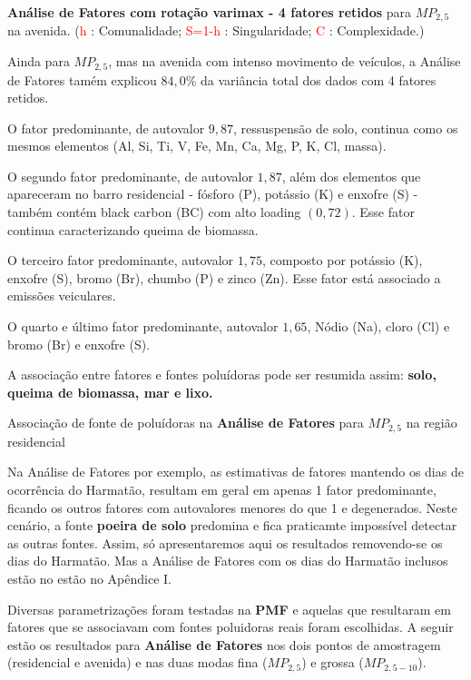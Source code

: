 \begin{table}[H]
  \caption{\textbf{Análise de Fatores com rotação varimax - 4 fatores retidos} 
             para $MP_{2,5}$ na avenida.
           (\textcolor{red}{h} : Comunalidade; 
           \textcolor{red}{S=1-h} : Singularidade; 
           \textcolor{red}{C} : Complexidade.)}
  
\end{table}

Ainda para $MP_{2,5}$, mas na avenida com intenso movimento de veículos,
a Análise de Fatores tamém explicou $84,0\%$ da variância total 
dos dados com 4 fatores retidos.

O fator predominante, de autovalor $9,87$, ressuspensão de solo, continua 
como os mesmos elementos (Al, Si, Ti, V, Fe, Mn, Ca, Mg, P, K, Cl, massa).

O segundo fator predominante, de autovalor $1,87$, além dos elementos que 
apareceram no barro residencial - fósforo (P), potássio (K) e enxofre (S) -
também contém black carbon (BC) com alto loading $(0,72)$. 
Esse fator continua caracterizando queima de biomassa.

O terceiro fator predominante, autovalor $1,75$, composto por
potássio (K), enxofre (S), bromo (Br), chumbo (P) e zinco (Zn). 
Esse fator está associado a emissões veiculares. 

O quarto e último fator predominante, autovalor $1,65$, 
Nódio (Na), cloro (Cl) e bromo (Br) e enxofre (S).

A associação entre fatores e fontes poluídoras pode ser resumida
assim: \textbf{solo, queima de biomassa, mar e lixo.}

\begin{table}[H]
  \centering
  \caption{Associação de fonte de poluídoras na \textbf{Análise de Fatores}
         para $MP_{2,5}$ na região residencial}
  
\end{table}

Na Análise de Fatores por exemplo, as estimativas de fatores 
mantendo os dias de ocorrência do Harmatão, resultam em geral em apenas 
1 fator predominante, ficando os outros fatores com autovalores
menores do que 1 e degenerados. Neste cenário, a fonte 
\textbf{poeira de solo} predomina e fica praticamte impossível
detectar as outras fontes. Assim, só apresentaremos aqui os resultados 
removendo-se os dias do Harmatão. Mas a Análise de Fatores com os
dias do Harmatão inclusos estão no estão no Apêndice I.

Diversas parametrizações foram testadas na \textbf{PMF}
e aquelas que resultaram em fatores que se associavam com fontes poluidoras
reais foram escolhidas. A seguir estão os resultados para 
\textbf{Análise de Fatores} nos dois pontos de amostragem 
(residencial e avenida) e nas duas modas
fina ($MP_{2,5}$) e grossa ($MP_{2,5-10}$).

